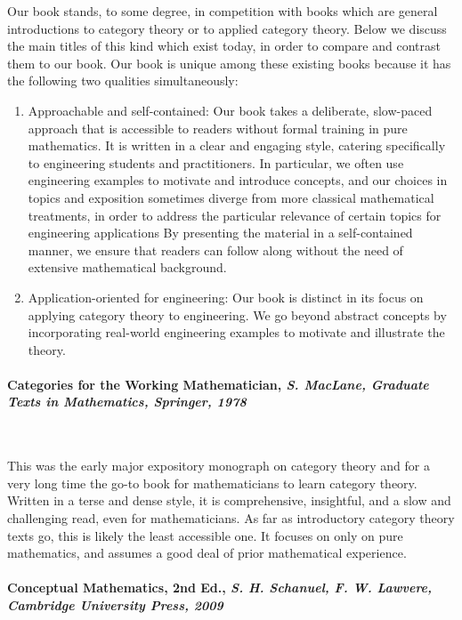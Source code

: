 \documentclass[10pt, article, one side]{memoir}
\begin{document}
    Our book stands, to some degree, in competition with books which are general introductions to category theory or to applied category theory.
    Below we discuss the main titles of this kind which exist today, in order to compare and contrast them to our book.
    Our book is unique among these existing books because it has the following two qualities simultaneously:
    \begin{enumerate}
        \item Approachable and self-contained: Our book takes a deliberate, slow-paced approach that is accessible to readers without formal training in pure mathematics.
              It is written in a clear and engaging style, catering specifically to engineering students and practitioners.
              In particular, we often use engineering examples to motivate and introduce concepts, and our choices in topics and exposition sometimes diverge from more classical mathematical treatments, in order to address the particular relevance of certain topics for engineering applications
              By presenting the material in a self-contained manner, we ensure that readers can follow along without the need of extensive mathematical background.

        \item Application-oriented for engineering: Our book is distinct in its focus on applying category theory to engineering.
              We go beyond abstract concepts by incorporating real-world engineering examples to motivate and illustrate the theory.
    \end{enumerate}

    \paragraph{Categories for the Working Mathematician, \emph{S.
            MacLane, Graduate Texts in Mathematics, Springer, 1978}~\cite{mac2013categories}}
    \

    This was the early major expository monograph on category theory and for a very long time the go-to book for mathematicians to learn category theory.
    Written in a terse and dense style, it is comprehensive, insightful, and a slow and challenging read, even for mathematicians.
    As far as introductory category theory texts go, this is likely the least accessible one.
    It focuses on only on pure mathematics, and assumes a good deal of prior mathematical experience.

    \paragraph{Conceptual Mathematics, 2nd Ed., \emph{S.
            H.
            Schanuel, F.
            W.
            Lawvere, Cambridge University Press, 2009}~\cite{lawvere2009conceptual}}
    \
\end{document}
